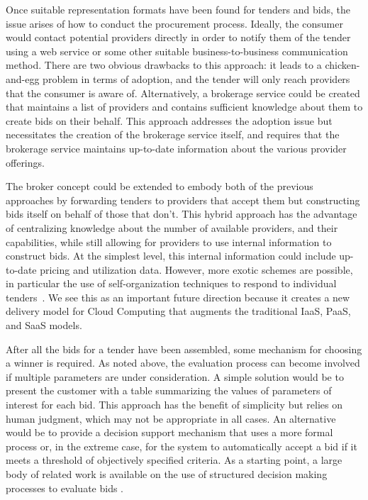 \documentclass[10pt, conference, compsocconf]{IEEEtran}
\begin{document}
Once suitable representation formats have been found for tenders and bids, the issue arises of how to conduct the procurement process. Ideally, the consumer would contact potential providers directly in order to notify them of the tender using a web service or some other suitable business-to-business communication method. There are two obvious drawbacks to this approach: it leads to a chicken-and-egg problem in terms of adoption, and the tender will only reach providers that the consumer is aware of. Alternatively, a brokerage service could be created that maintains a list of providers and contains sufficient knowledge about them to create bids on their behalf. This approach addresses the adoption issue but necessitates the creation of the brokerage service itself, and requires that the brokerage service maintains up-to-date information about the various provider offerings.

The broker concept could be extended to embody both of the previous approaches by forwarding tenders to providers that accept them but constructing bids itself on behalf of those that don't. This hybrid approach has the advantage of centralizing knowledge about the number of available providers, and their capabilities, while still allowing for providers to use internal information to construct bids. At the simplest level, this internal information could include up-to-date pricing and utilization data. However, more exotic schemes are possible, in particular the use of self-organization techniques to respond to individual tenders~\cite{marinescu2013auction}. We see this as an important future direction because it creates a new delivery model for Cloud Computing that augments the traditional IaaS, PaaS, and SaaS models.

After all the bids for a tender have been assembled, some mechanism for choosing a winner is required. As noted above, the evaluation process can become involved if multiple parameters are under consideration. A simple solution would be to present the customer with a table summarizing the values of parameters of interest for each bid. This approach has the benefit of simplicity but relies on human judgment, which may not be appropriate in all cases. An alternative would be to provide a decision support mechanism that uses a more formal process or, in the extreme case, for the system to automatically accept a bid if it meets a threshold of objectively specified criteria. As a starting point, a large body of related work is available on the use of structured decision making processes to evaluate bids \cite{de2001review}.
\end{document}

